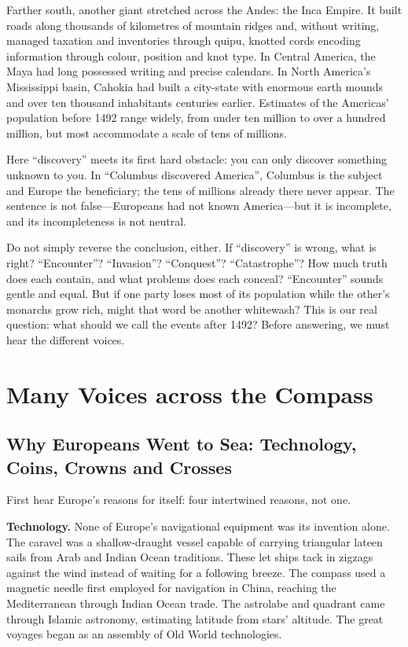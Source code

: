 Farther south, another giant stretched across the Andes: the Inca Empire. It built roads along thousands of kilometres of mountain ridges and, without writing, managed taxation and inventories through quipu, knotted cords encoding information through colour, position and knot type. In Central America, the Maya had long possessed writing and precise calendars. In North America's Mississippi basin, Cahokia had built a city-state with enormous earth mounds and over ten thousand inhabitants centuries earlier. Estimates of the Americas' population before 1492 range widely, from under ten million to over a hundred million, but most accommodate a scale of tens of millions.

Here ``discovery'' meets its first hard obstacle: you can only discover something unknown to you. In ``Columbus discovered America'', Columbus is the subject and Europe the beneficiary; the tens of millions already there never appear. The sentence is not false---Europeans had not known America---but it is incomplete, and its incompleteness is not neutral.

Do not simply reverse the conclusion, either. If ``discovery'' is wrong, what is right? ``Encounter''? ``Invasion''? ``Conquest''? ``Catastrophe''? How much truth does each contain, and what problems does each conceal? ``Encounter'' sounds gentle and equal. But if one party loses most of its population while the other's monarchs grow rich, might that word be another whitewash? This is our real question: what should we call the events after 1492? Before answering, we must hear the different voices.

\section{Many Voices across the Compass}
\subsection[Why Europeans Went to Sea]{Why Europeans Went to Sea: Technology, Coins, Crowns and Crosses}
First hear Europe's reasons for itself: four intertwined reasons, not one.

\textbf{Technology.} None of Europe's navigational equipment was its invention alone. The caravel was a shallow-draught vessel capable of carrying triangular lateen sails from Arab and Indian Ocean traditions. These let ships tack in zigzags against the wind instead of waiting for a following breeze. The compass used a magnetic needle first employed for navigation in China, reaching the Mediterranean through Indian Ocean trade. The astrolabe and quadrant came through Islamic astronomy, estimating latitude from stars' altitude. The great voyages began as an assembly of Old World technologies.

